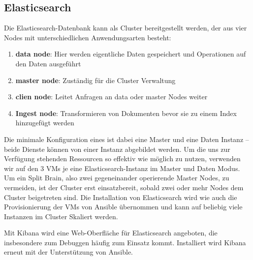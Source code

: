 \subsection{Elasticsearch}
Die Elasticsearch-Datenbank kann als Cluster bereitgestellt werden, der aus vier Nodes mit unterschiedlichen Anwendungsarten besteht:
\begin{enumerate}
        \item \textbf{data node}: Hier werden eigentliche Daten gespeichert und Operationen auf den Daten ausgeführt
        \item \textbf{master node}: Zuständig für die Cluster Verwaltung
        \item \textbf{clien node}: Leitet Anfragen an data oder master Nodes weiter
        \item \textbf{Ingest node}: Transformieren von Dokumenten bevor sie zu einem Index hinzugefügt werden
\end{enumerate}
Die minimale Konfiguration eines  ist dabei eine Master und eine Daten Instanz – beide Dienste können von einer Instanz abgebildet werden.
Um die uns zur Verfügung stehenden Ressourcen so effektiv wie möglich zu nutzen, verwenden wir auf den 3 VMs je eine Elasticsearch-Instanz im Master und Daten Modus.
Um ein Split Brain, also zwei gegeneinander operierende Master Nodes, zu vermeiden, ist der Cluster erst einsatzbereit, sobald zwei oder mehr Nodes dem Cluster beigetreten sind.
Die Installation von Elasticsearch wird wie auch die Provisionierung der VMs von Ansible übernommen und kann auf beliebig viele Instanzen im Cluster Skaliert werden.

Mit Kibana \cite{esk} wird eine Web-Oberfläche für Elasticsearch angeboten, die insbesondere zum Debuggen häufig zum Einsatz kommt.
Installiert wird Kibana erneut mit der Unterstützung von Ansible.
